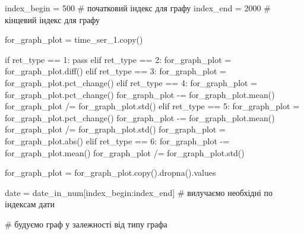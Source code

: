 \documentclass[
  letterpaper,
]{report}
\newenvironment{Shaded}{\begin{snugshade}}{\end{snugshade}}
\newcommand{\BuiltInTok}[1]{\textcolor[rgb]{0.00,0.23,0.31}{#1}}
\newcommand{\CommentTok}[1]{\textcolor[rgb]{0.37,0.37,0.37}{#1}}
\newcommand{\ControlFlowTok}[1]{\textcolor[rgb]{0.00,0.23,0.31}{#1}}
\newcommand{\DecValTok}[1]{\textcolor[rgb]{0.68,0.00,0.00}{#1}}
\newcommand{\NormalTok}[1]{\textcolor[rgb]{0.00,0.23,0.31}{#1}}
\newcommand{\OperatorTok}[1]{\textcolor[rgb]{0.37,0.37,0.37}{#1}}
\begin{document}
\begin{Shaded}
\begin{Highlighting}[]
\NormalTok{index\_begin }\OperatorTok{=} \DecValTok{500} \CommentTok{\# початковий індекс для графу}
\NormalTok{index\_end }\OperatorTok{=} \DecValTok{2000} \CommentTok{\# кінцевий індекс для графу}

\NormalTok{for\_graph\_plot }\OperatorTok{=}\NormalTok{ time\_ser\_1.copy()}

\ControlFlowTok{if}\NormalTok{ ret\_type }\OperatorTok{==} \DecValTok{1}\NormalTok{:}
    \ControlFlowTok{pass}
\ControlFlowTok{elif}\NormalTok{ ret\_type }\OperatorTok{==} \DecValTok{2}\NormalTok{:}
\NormalTok{    for\_graph\_plot }\OperatorTok{=}\NormalTok{ for\_graph\_plot.diff()}
\ControlFlowTok{elif}\NormalTok{ ret\_type }\OperatorTok{==} \DecValTok{3}\NormalTok{:}
\NormalTok{    for\_graph\_plot }\OperatorTok{=}\NormalTok{ for\_graph\_plot.pct\_change()}
\ControlFlowTok{elif}\NormalTok{ ret\_type }\OperatorTok{==} \DecValTok{4}\NormalTok{:}
\NormalTok{    for\_graph\_plot }\OperatorTok{=}\NormalTok{ for\_graph\_plot.pct\_change()}
\NormalTok{    for\_graph\_plot }\OperatorTok{{-}=}\NormalTok{ for\_graph\_plot.mean()}
\NormalTok{    for\_graph\_plot }\OperatorTok{/=}\NormalTok{ for\_graph\_plot.std()}
\ControlFlowTok{elif}\NormalTok{ ret\_type }\OperatorTok{==} \DecValTok{5}\NormalTok{: }
\NormalTok{    for\_graph\_plot }\OperatorTok{=}\NormalTok{ for\_graph\_plot.pct\_change()}
\NormalTok{    for\_graph\_plot }\OperatorTok{{-}=}\NormalTok{ for\_graph\_plot.mean()}
\NormalTok{    for\_graph\_plot }\OperatorTok{/=}\NormalTok{ for\_graph\_plot.std()}
\NormalTok{    for\_graph\_plot }\OperatorTok{=}\NormalTok{ for\_graph\_plot.}\BuiltInTok{abs}\NormalTok{()}
\ControlFlowTok{elif}\NormalTok{ ret\_type }\OperatorTok{==} \DecValTok{6}\NormalTok{:}
\NormalTok{    for\_graph\_plot }\OperatorTok{{-}=}\NormalTok{ for\_graph\_plot.mean()}
\NormalTok{    for\_graph\_plot }\OperatorTok{/=}\NormalTok{ for\_graph\_plot.std()}

\NormalTok{for\_graph\_plot }\OperatorTok{=}\NormalTok{ for\_graph\_plot.copy().dropna().values}

\NormalTok{date }\OperatorTok{=}\NormalTok{ date\_in\_num[index\_begin:index\_end] }\CommentTok{\# вилучаємо необхідні по індексам дати}

\CommentTok{\# будуємо граф у залежності від типу графа}


\end{Highlighting}
\end{Shaded}
\end{document}
